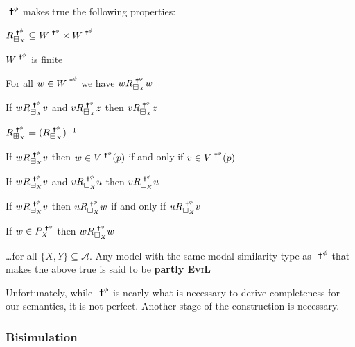 \begin{lemma}\label{partly}
$\Cross^\phi$ makes true the following properties:
\begin{mynum}
\item $R^{\Cross^\phi}_{\BB_X} \subseteq W^{\Cross^\phi} \times W^{\Cross^\phi}$
\item $W^{\Cross^\phi}$ is finite
\item For all $w \in W^{\Cross^\phi}$ we have $w R^{\Cross^\phi}_{\BB_X} w$ 
\item If $w R^{\Cross^\phi}_{\BB_X} v$ and $v R^{\Cross^\phi}_{\BB_X} z$ then $v R^{\Cross^\phi}_{\BB_X} z$
\item $R^{\Cross^\phi}_{\BBI_X} = (R^{\Cross^\phi}_{\BB_X})^{-1}$
\item If $w R^{\Cross^\phi}_{\BB_X} v$ then $w \in V^{\Cross^\phi}(p)$ if and only if $v \in V^{\Cross^\phi}(p)$
\item If $w R^{\Cross^\phi}_{\BB_X} v$ and $v R^{\Cross^\phi}_{\Nec_X} u$ then $v R^{\Cross^\phi}_{\Nec_X} u$
\item If $w R^{\Cross^\phi}_{\BB_X} v$ then $u R^{\Cross^\phi}_{\Nec_X} w$ if and only if $u R^{\Cross^\phi}_{\Nec_X} v$
\item If $w\in P^{\Cross^\phi}_X$ then $w R^{\Cross^\phi}_{\Nec_X} w$
\end{mynum}
\ldots for all $\{X,Y\} \subseteq \mathcal{A}$.  Any model with the same modal similarity type as $\Cross^\phi$ that makes the above true is said to be \textbf{partly \textsc{EviL}}

\end{lemma}

Unfortunately, while $\Cross^\phi$ is nearly what is necessary to derive completeness for our semantics, it is not perfect.  Another stage of the construction is necessary.

\subsubsection{Bisimulation}

